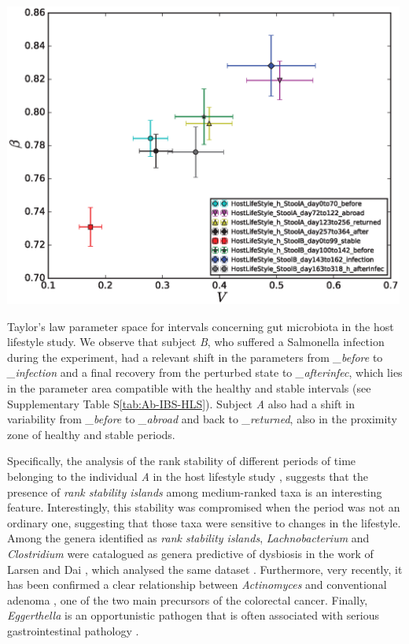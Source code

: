 \begin{supfig}
	\centering
	\includegraphics[width=0.99\textwidth]{figs/supfig_HLS_xWSummary.eps}
	\caption{Taylor's law parameter space for intervals concerning gut microbiota in the host lifestyle study\cite{hostlife}. We observe that subject \emph{B}, who suffered a Salmonella infection during the experiment, had a relevant shift in the parameters from \emph{\_before} to \emph{\_infection} and a final recovery from the perturbed state to \emph{\_afterinfec}, which lies in the parameter area compatible with the healthy and stable intervals (see Supplementary Table S\ref{tab:Ab-IBS-HLS}). Subject \emph{A} also had a shift in variability from \emph{\_before} to \emph{\_abroad} and back to \emph{\_returned}, also in the proximity zone of healthy and stable periods.}
	\label{supfig:HLS_xWSummary}
\end{supfig}
 
Specifically, the analysis of the rank stability of different periods of time belonging to the individual \emph{A} in the host lifestyle study \cite{hostlife}, suggests that the presence of \emph{rank stability islands} among medium-ranked taxa is an interesting feature. Interestingly, this stability was compromised when the period was not an ordinary one, suggesting that those taxa were sensitive to changes in the lifestyle. Among the genera identified as \emph{rank stability islands}, \emph{Lachnobacterium} and \emph{Clostridium} were catalogued as genera predictive of dysbiosis in the work of Larsen and Dai \cite{rsi_dysbiosis}, which analysed the same dataset \cite{hostlife}. Furthermore, very recently, it has been confirmed a clear relationship between \emph{Actinomyces} and conventional adenoma \cite{rsi_actino}, one of the two main precursors of the colorectal cancer. Finally, \emph{Eggerthella} is an opportunistic pathogen that is often associated with serious gastrointestinal pathology \cite{rsi_egg}.

